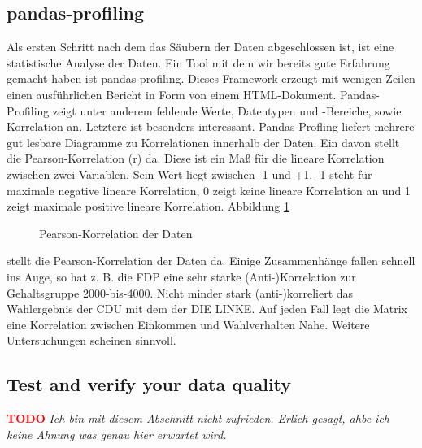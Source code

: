 \documentclass[a4paper,10pt]{scrartcl}
\newcommand{\TODO}{\textcolor{red}{\textbf{TODO }}}
\begin{document}
\subsection{pandas-profiling}
Als ersten Schritt nach dem das Säubern der Daten abgeschlossen ist, ist eine statistische Analyse der Daten. Ein Tool mit dem wir bereits gute Erfahrung gemacht haben ist pandas-profiling. Dieses Framework erzeugt mit wenigen Zeilen einen ausführlichen Bericht in Form von einem HTML-Dokument. Pandas-Profiling zeigt unter anderem fehlende Werte, Datentypen und -Bereiche, sowie Korrelation an. Letztere ist besonders interessant. Pandas-Profling liefert mehrere gut lesbare Diagramme zu Korrelationen innerhalb der Daten. Ein davon stellt die Pearson-Korrelation (r) da. Diese ist ein Maß für die lineare Korrelation zwischen zwei Variablen. Sein Wert liegt zwischen -1 und +1. -1 steht für maximale negative lineare Korrelation, 0 zeigt keine lineare Korrelation an und 1 zeigt maximale positive lineare Korrelation. Abbildung \ref{fig:correlation}\begin{figure}
	\centering
	\caption{Pearson-Korrelation der Daten}
	\label{fig:correlation}
\end{figure}
 stellt die Pearson-Korrelation der Daten da. Einige Zusammenhänge fallen schnell ins Auge, so hat z. B. die FDP eine sehr starke (Anti-)Korrelation zur Gehaltsgruppe 2000-bis-4000. Nicht minder stark (anti-)korreliert das Wahlergebnis der CDU mit dem der DIE LINKE. Auf jeden Fall legt die Matrix eine Korrelation zwischen Einkommen und Wahlverhalten Nahe. Weitere Untersuchungen scheinen sinnvoll. 

\subsection{Test and verify your data quality}
\TODO \emph{Ich bin mit diesem Abschnitt nicht zufrieden. Erlich gesagt, ahbe ich keine Ahnung was genau hier erwartet wird.}
\end{document}
